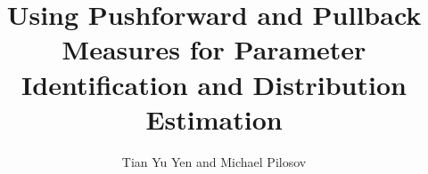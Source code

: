\documentclass[final]{beamer}
\title{Using Pushforward and Pullback Measures for Parameter Identification and Distribution Estimation}
\author{Tian Yu Yen and Michael Pilosov}
\institute[shortinst]{University of Colorado: Denver}
\newlength{\sepwidth}
\newlength{\colwidth}
\newcommand{\separatorcolumn}{\begin{column}{\sepwidth}\end{column}}
\begin{document}
\begin{frame}[t]
\begin{columns}[t]
\separatorcolumn

\begin{column}{\colwidth}

  

\end{column}

\separatorcolumn

\begin{column}{\colwidth}
    
    \vspace{-2.5cm}
    
    \vspace{-2.5cm}
  
  
\end{column}

\separatorcolumn

\begin{column}{\colwidth}

  
  
\end{column}

\separatorcolumn
\end{columns}
\end{frame}
\end{document}
